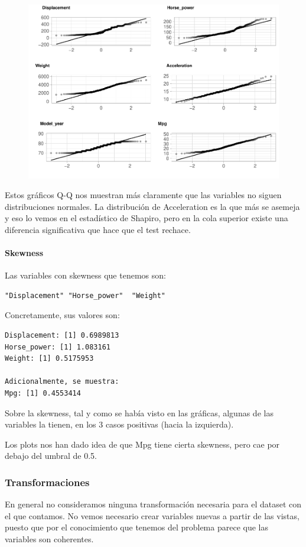 \begin{figure}[H]\includegraphics[width=.9\linewidth]{img/EDA_files/figure-latex/unnamed-chunk-14-7} \caption{}\end{figure}

Estos gráficos Q-Q nos muestran más claramente que las variables no siguen distribuciones normales. La distribución de Acceleration es la que más se asemeja y eso lo vemos en el estadístico de Shapiro, pero en la cola superior existe una diferencia significativa que hace que el test rechace.

\paragraph{Skewness}
Las variables con skewness que tenemos son:

\begin{verbatim}
"Displacement" "Horse_power"  "Weight"      
\end{verbatim}

Concretamente, sus valores son:

\begin{verbatim}
Displacement: [1] 0.6989813
Horse_power: [1] 1.083161
Weight: [1] 0.5175953

Adicionalmente, se muestra:
Mpg: [1] 0.4553414
\end{verbatim}

Sobre la skewness, tal y como se había visto en las gráficas, algunas de las variables la tienen, en los 3 casos positivas (hacia la izquierda).

Los plots nos han dado idea de que Mpg tiene cierta skewness, pero cae por debajo del umbral de 0.5.

\subsubsection{Transformaciones}
En general no consideramos ninguna transformación necesaria para el dataset con el que contamos.
No vemos necesario crear variables nuevas a partir de las vistas, puesto que por el conocimiento que tenemos del problema parece que las variables son coherentes.

